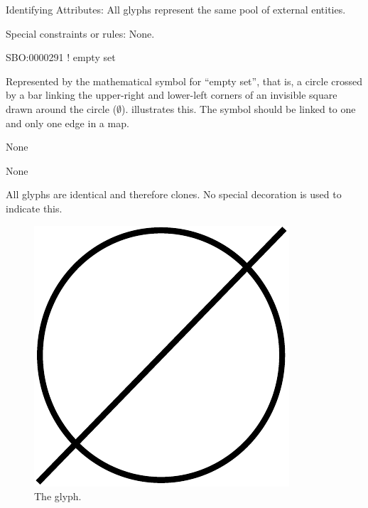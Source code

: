 \begin{glyphDescription}

\item[Identifying Attributes:]\mbox{} All glyphs represent the same
  pool of external entities.

\item[Special constraints or rules:]\mbox{}\newline None.

\glyphSboTerm SBO:0000291 ! empty set

\glyphContainer Represented by the mathematical symbol for ``empty
set'', that is, a circle crossed by a bar linking the upper-right and
lower-left corners of an invisible square drawn around the circle ($\emptyset$).
 illustrates this.  The symbol should be linked to one
and only one edge in a map.

\glyphLabel None

\glyphAux None

\glyphCloning All glyphs are identical and therefore clones. No
special decoration is used to indicate this.

\end{glyphDescription}

\begin{figure}[H]
  \centering
  \includegraphics[scale = 0.3]{images/sourceSink}
  \caption{The  glyph.}
  \label{fig:sourceSink}
\end{figure}







